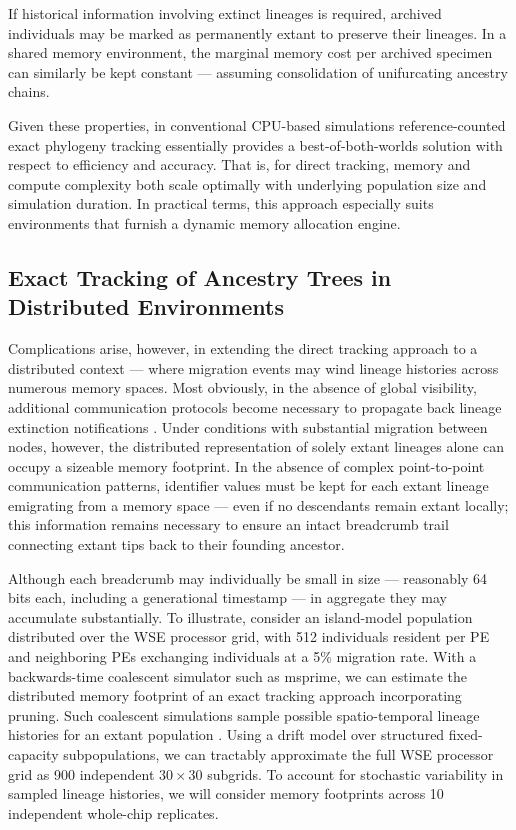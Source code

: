 If historical information involving extinct lineages is required, archived individuals may be marked as permanently extant to preserve their lineages.
In a shared memory environment, the marginal memory cost per archived specimen can similarly be kept constant --- assuming consolidation of unifurcating ancestry chains.

Given these properties, in conventional CPU-based simulations reference-counted exact phylogeny tracking essentially provides a best-of-both-worlds solution with respect to efficiency and accuracy.
That is, for direct tracking, memory and compute complexity both scale optimally with underlying population size and simulation duration.
In practical terms, this approach especially suits environments that furnish a dynamic memory allocation engine.

\subsection{Exact Tracking of Ancestry Trees in Distributed Environments}

Complications arise, however, in extending the direct tracking approach to a distributed context --- where migration events may wind lineage histories across numerous memory spaces.
Most obviously, in the absence of global visibility, additional communication protocols become necessary to propagate back lineage extinction notifications \citep{moreno2024algorithms}.
Under conditions with substantial migration between nodes, however, the distributed representation of solely extant lineages alone can occupy a sizeable memory footprint.
In the absence of complex point-to-point communication patterns, identifier values must be kept for each extant lineage emigrating from a memory space --- even if no descendants remain extant locally;
this information remains necessary to ensure an intact breadcrumb trail connecting extant tips back to their founding ancestor.

Although each breadcrumb may individually be small in size --- reasonably 64 bits each, including a generational timestamp --- in aggregate they may accumulate substantially.
To illustrate, consider an island-model population distributed over the WSE processor grid, with 512 individuals resident per PE and neighboring PEs exchanging individuals at a 5\% migration rate.
With a backwards-time coalescent simulator such as msprime, we can estimate the distributed memory footprint of an exact tracking approach incorporating pruning.
Such coalescent simulations sample possible spatio-temporal lineage histories for an extant population \citep{TODO}.
Using a drift model over structured fixed-capacity subpopulations, we can tractably approximate the full WSE processor grid as 900 independent $30 \times 30$ subgrids.
To account for stochastic variability in sampled lineage histories, we will consider memory footprints across 10 independent whole-chip replicates.

